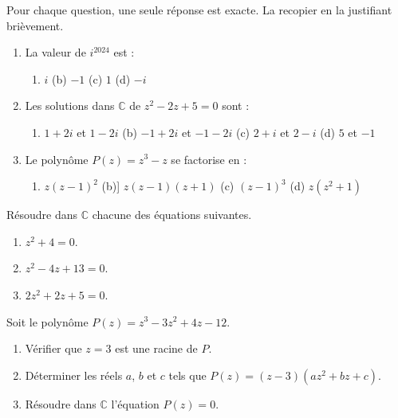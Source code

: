 \documentclass[11pt]{article}
\begin{document}
\begin{exercice}[QCM]
Pour chaque question, une seule réponse est exacte. La recopier en la justifiant brièvement.
\begin{enumerate}
\item La valeur de $i^{2024}$ est :
\begin{enumerate}
\item[(a)] $i$ \quad (b) $-1$ \quad (c) $1$ \quad (d) $-i$
\end{enumerate}
\item Les solutions dans $\mathbb{C}$ de $z^2-2z+5=0$ sont :
\begin{enumerate}
\item[(a)] $1+2i$ et $1-2i$ \quad (b) $-1+2i$ et $-1-2i$ \quad (c) $2+i$ et $2-i$ \quad (d) $5$ et $-1$
\end{enumerate}
\item Le polynôme $P(z)=z^3-z$ se factorise en :
\begin{enumerate}
\item[(a)] $z(z-1)^2$ \quad (b)] $z(z-1)(z+1)$ \quad (c) $(z-1)^3$ \quad (d) $z(z^2+1)$
\end{enumerate}
\end{enumerate}
\end{exercice}

\begin{exercice}
Résoudre dans $\mathbb{C}$ chacune des équations suivantes.
\begin{enumerate}
\item $z^2+4=0$.
\item $z^2-4z+13=0$.
\item $2z^2+2z+5=0$.
\end{enumerate}
\end{exercice}

\begin{exercice}
Soit le polynôme $P(z)=z^3-3z^2+4z-12$.
\begin{enumerate}
\item Vérifier que $z=3$ est une racine de $P$.
\item Déterminer les réels $a$, $b$ et $c$ tels que $P(z)=(z-3)(az^2+bz+c)$.
\item Résoudre dans $\mathbb{C}$ l'équation $P(z)=0$.
\end{enumerate}
\end{exercice}
\end{document}

